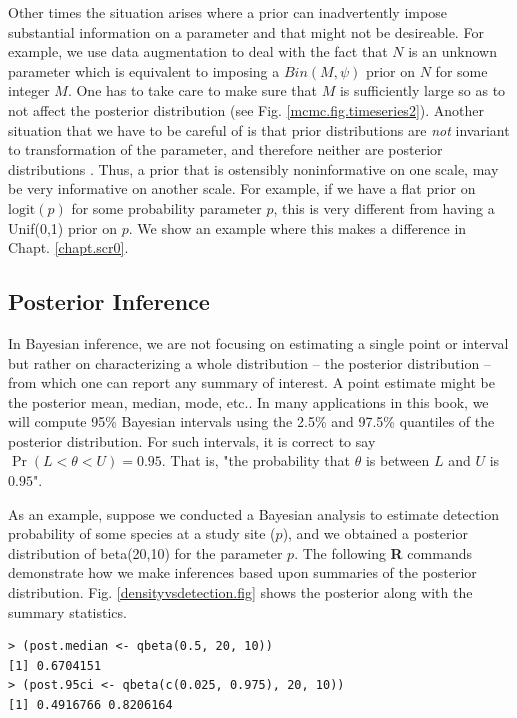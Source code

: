 Other times the situation arises where a prior can inadvertently impose
substantial information on a parameter and that might not be desireable.
For example, we use data augmentation
to deal with the fact that $N$ is an unknown parameter
 \citep{royle_etal:2007} which is equivalent to imposing a $Bin(M,\psi)$
 prior on $N$ for some integer $M$. One has to take care to make sure
 that $M$ is sufficiently large so as to not affect the posterior
 distribution (see Fig. \ref{mcmc.fig.timeseries2}).
Another situation that we have
 to be careful of is that
prior 
distributions are {\it not} invariant to transformation of the
parameter,
and therefore neither are posterior distributions
\citep[][sec. 6.2.1]{link_barker:2010}. Thus, a prior that is ostensibly
noninformative on one scale, may be very informative on another
scale. 
For example, if we have a flat prior on $\mbox{logit}(p)$ for some probability
parameter $p$, this is very different from having a 
\mbox{Unif}(0,1) prior 
on $p$. We show an example where this makes a difference in Chapt. \ref{chapt.scr0}.

\subsection{Posterior Inference}

In Bayesian inference, we are not focusing on estimating a single
point or interval but rather on characterizing a whole distribution --
the posterior distribution -- from which one can report any summary of
interest. A point estimate might be the posterior mean, median, mode,
etc..  In many applications in this book, we will compute 95\%
Bayesian intervals using the 2.5\% and 97.5\% quantiles of the
posterior distribution. For such intervals, it is correct to say
$\Pr(L < \theta < U) = 0.95$. That is, "the probability that $\theta$
is between $L$ and $U$ is $0.95$". 

As an
example, suppose we conducted a Bayesian analysis to estimate
detection probability of some species at a study site ($p$), and we
obtained a posterior distribution of beta(20,10) for the parameter
$p$. The following {\bf R} commands demonstrate how we make inferences based
upon summaries of the posterior distribution. Fig. \ref{densityvsdetection.fig} shows the
posterior along with the summary statistics.

\begin{verbatim}
> (post.median <- qbeta(0.5, 20, 10))
[1] 0.6704151
> (post.95ci <- qbeta(c(0.025, 0.975), 20, 10))
[1] 0.4916766 0.8206164
\end{verbatim}

